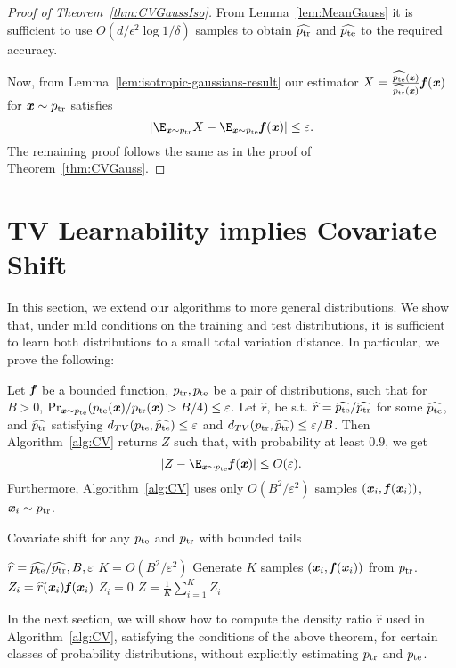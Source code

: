 \begin{proof}[Proof of Theorem~\ref{thm:CVGaussIso}]
From Lemma~\ref{lem:MeanGauss} it is sufficient to use $O(d/\epsilon^2\log 1/\delta)$ samples to obtain $\widehat{p_{\mathrm{tr}}}$ and $\widehat{p_{\mathrm{te}}}$ to the required accuracy.

Now, from Lemma~\ref{lem:isotropic-gaussians-result} our estimator $X = \frac{\widehat{p_{\mathrm{te}}}(\boldsymbol{\mathit{x}})}{\widehat{p_{\mathrm{tr}}}(\boldsymbol{\mathit{x}})}\boldsymbol{\mathit{f}}(\boldsymbol{\mathit{x}})$ for $\boldsymbol{\mathit{x}} \sim p_{\mathrm{tr}}$ satisfies 
\begin{equation*}
    |\E_{\xx\sim \ptr} X - \E_{\xx\sim \pte}\ff(\xx)| \leq \varepsilon.
\end{equation*}
The remaining proof follows the same as in the proof of Theorem~\ref{thm:CVGauss}.
\end{proof}


\section{TV Learnability implies Covariate Shift}\label{sec:TV}

In this section, we extend our algorithms to more general distributions. We show that, under mild conditions on the training and test distributions, it is sufficient to learn both distributions to a small total variation distance. In particular, we prove the following:

\begin{theorem}
\label{thm:shift-TV}
    Let $\boldsymbol{\mathit{f}}$ be a bounded function, $p_{\mathrm{tr}}, p_{\mathrm{te}}$ be a pair of distributions, such that for $B>0$, $\Pr_{\boldsymbol{\mathit{x}} \sim p_{\mathrm{te}}}(p_{\mathrm{te}}(\boldsymbol{\mathit{x}}) / p_{\mathrm{tr}}(\boldsymbol{\mathit{x}}) > B/4) \leq \varepsilon$. Let $\widehat{r}$, be s.t. $\widehat{r} = \widehat{p_{\mathrm{te}}}/\widehat{p_{\mathrm{tr}}}$ for some $\widehat{p_{\mathrm{te}}}$, and $\widehat{p_{\mathrm{tr}}}$ satisfying $d_{TV}(p_{\mathrm{te}}, \widehat{p_{\mathrm{te}}}) \leq \varepsilon$ and $d_{TV}(p_{\mathrm{tr}}, \widehat{p_{\mathrm{tr}}}) \leq \varepsilon / B$. Then Algorithm~\ref{alg:CV} returns $Z$ such that, with probability at least $0.9$, we get
    \begin{equation*}
        |Z -\E_{\xx\sim \pte} \ff(\xx)| \leq O(\varepsilon).
    \end{equation*}
    Furthermore, Algorithm~\ref{alg:CV} uses only $O(B^2 / \varepsilon^2)$ samples $(\boldsymbol{\mathit{x}}_i, \boldsymbol{\mathit{f}}(\boldsymbol{\mathit{x}}_i))$, $\boldsymbol{\mathit{x}}_i\sim p_{\mathrm{tr}}$.
\end{theorem}

 \begin{algorithm}
 \caption{Covariate shift for any $p_{\mathrm{te}}$ and $p_{\mathrm{tr}}$ with bounded tails}
 \label{alg:CV}
 \begin{algorithmic}[1]
  $\widehat{r} =\widehat{p_{\mathrm{te}}}/\widehat{p_{\mathrm{tr}}},B,\varepsilon$
 \STATE $K = O(B^2/\varepsilon^2)$
 \STATE Generate $K$ samples $(\boldsymbol{\mathit{x}}_i,\boldsymbol{\mathit{f}}(\boldsymbol{\mathit{x}}_i))$ from $p_{\mathrm{tr}}$.
 \STATE $Z_i = \widehat{r}(\boldsymbol{\mathit{x}}_i)\boldsymbol{\mathit{f}}(\boldsymbol{\mathit{x}}_i)$
\ELSE
\STATE $Z_i = 0$
 \ENDIF
  $Z = \frac{1}{K}\sum_{i=1}^K Z_i$
 \end{algorithmic}
 \end{algorithm}
In the next section, we will show how to compute the density ratio $\widehat{r}$ used in Algorithm~\ref{alg:CV}, satisfying the conditions of the above theorem, for certain classes of probability distributions, without explicitly estimating $p_{\mathrm{tr}}$ and $p_{\mathrm{te}}$.

